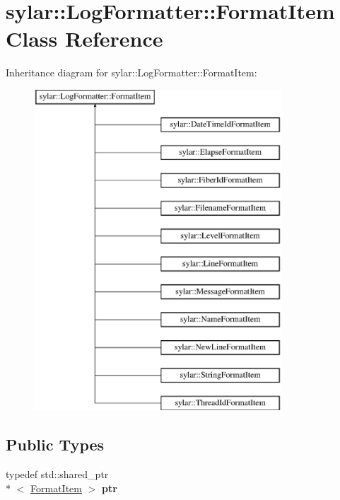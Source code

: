 \hypertarget{classsylar_1_1LogFormatter_1_1FormatItem}{\section{sylar\-:\-:Log\-Formatter\-:\-:Format\-Item Class Reference}
\label{classsylar_1_1LogFormatter_1_1FormatItem}
}
Inheritance diagram for sylar\-:\-:Log\-Formatter\-:\-:Format\-Item\-:\begin{figure}[H]
\begin{center}
\leavevmode
\includegraphics[height=12.000000cm]{classsylar_1_1LogFormatter_1_1FormatItem}
\end{center}
\end{figure}
\subsection*{Public Types}
\begin{DoxyCompactItemize}
\item 
\hypertarget{classsylar_1_1LogFormatter_1_1FormatItem_ad93e3dca34abd8e81366a141f67dbd95}{typedef std\-::shared\-\_\-ptr\\*
$<$ \hyperlink{classsylar_1_1LogFormatter_1_1FormatItem}{Format\-Item} $>$ {\bfseries ptr}}\label{classsylar_1_1LogFormatter_1_1FormatItem_ad93e3dca34abd8e81366a141f67dbd95}

\end{DoxyCompactItemize}
